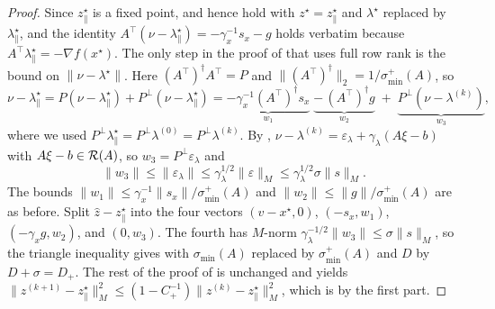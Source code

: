 \documentclass[11pt]{article}
\begin{document}
\begin{proof}
    Since $z^\star_\parallel$ is a fixed point,  and hence  hold with $z^\star = z^\star_\parallel$ and $\lambda^\star$ replaced by $\lambda^\star_\parallel$, and the identity $A^\top(\nu - \lambda^\star_\parallel) = -\gamma_x^{-1}s_x - g$ holds verbatim because $A^\top\lambda^\star_\parallel = -\nabla f(x^\star)$.
    The only step in the proof of  that uses full row rank is the bound on $\|\nu - \lambda^\star\|$.
    Here $(A^\top)^\dagger A^\top = P$ and $\|(A^\top)^\dagger\|_2 = 1/\sigma_{\min}^+(A)$, so
    \begin{equation*}
        \nu - \lambda^\star_\parallel = P(\nu - \lambda^\star_\parallel) + P^\perp(\nu - \lambda^\star_\parallel)
        = \underbrace{-\gamma_x^{-1}(A^\top)^\dagger s_x}_{w_1} \;\underbrace{-\, (A^\top)^\dagger g}_{w_2} \;+\; \underbrace{P^\perp(\nu - \lambda^{(k)})}_{w_3},
    \end{equation*}
    where we used $P^\perp\lambda^\star_\parallel = P^\perp\lambda^{(0)} = P^\perp\lambda^{(k)}$.
    By , $\nu - \lambda^{(k)} = \varepsilon_\lambda + \gamma_\lambda(A\xi - b)$ with $A\xi - b \in {\mathcal R}(A)$, so $w_3 = P^\perp\varepsilon_\lambda$ and
    \begin{equation*}
        \|w_3\| \leq \|\varepsilon_\lambda\| \leq \gamma_\lambda^{1/2}\|\varepsilon\|_M \leq \gamma_\lambda^{1/2}\sigma\|s\|_M.
    \end{equation*}
    The bounds $\|w_1\| \leq \gamma_x^{-1}\|s_x\|/\sigma_{\min}^+(A)$ and $\|w_2\| \leq \|g\|/\sigma_{\min}^+(A)$ are as before.
    Split $\hat z - z^\star_\parallel$ into the four vectors $(v - x^\star, 0)$, $(-s_x, w_1)$, $(-\gamma_x g, w_2)$, and $(0, w_3)$.
    The fourth has $M$-norm $\gamma_\lambda^{-1/2}\|w_3\| \leq \sigma\|s\|_M$, so the triangle inequality gives  with $\sigma_{\min}(A)$ replaced by $\sigma_{\min}^+(A)$ and $D$ by $D + \sigma = D_+$.
    The rest of the proof of  is unchanged and yields $\|z^{(k+1)} - z^\star_\parallel\|_M^2 \leq (1 - C_+^{-1})\|z^{(k)} - z^\star_\parallel\|_M^2$, which is  by the first part.
\end{proof}
\end{document}
